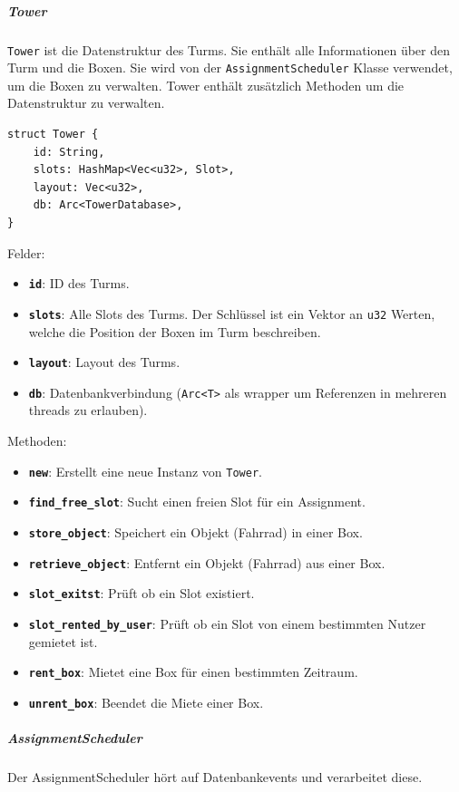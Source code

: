 \subparagraph{Tower}

\texttt{Tower} ist die Datenstruktur des Turms. Sie enthält alle Informationen über den Turm und die Boxen. Sie wird von der \texttt{AssignmentScheduler} Klasse verwendet, um die Boxen zu verwalten. Tower enthält zusätzlich Methoden um die Datenstruktur zu verwalten.


\begin{verbatim}
struct Tower {
    id: String,
    slots: HashMap<Vec<u32>, Slot>,
    layout: Vec<u32>,
    db: Arc<TowerDatabase>,
}
\end{verbatim}

Felder:
\begin{itemize}
  \item \textbf{\texttt{id}}: ID des Turms.
  \item \textbf{\texttt{slots}}: Alle Slots des Turms. Der Schlüssel ist ein Vektor an \texttt{u32} Werten, welche die Position der Boxen im Turm beschreiben.
  \item \textbf{\texttt{layout}}: Layout des Turms.
  \item \textbf{\texttt{db}}: Datenbankverbindung (\texttt{Arc<T>} als \Gls{wrapper} um Referenzen in mehreren \Glspl{thread} zu erlauben).
\end{itemize}

Methoden:
\begin{itemize}
  \item \textbf{\texttt{new}}: Erstellt eine neue Instanz von \texttt{Tower}.
  \item \textbf{\texttt{find\_free\_slot}}: Sucht einen freien Slot für ein Assignment.
  \item \textbf{\texttt{store\_object}}: Speichert ein Objekt (Fahrrad) in einer Box.
  \item \textbf{\texttt{retrieve\_object}}: Entfernt ein Objekt (Fahrrad) aus einer Box.
  \item \textbf{\texttt{slot\_exitst}}: Prüft ob ein Slot existiert.
  \item \textbf{\texttt{slot\_rented\_by\_user}}: Prüft ob ein Slot von einem bestimmten Nutzer gemietet ist.
  \item \textbf{\texttt{rent\_box}}: Mietet eine Box für einen bestimmten Zeitraum.
        \item\textbf{\texttt{unrent\_box}}: Beendet die Miete einer Box.
\end{itemize}


\subparagraph{AssignmentScheduler}

Der AssignmentScheduler hört auf Datenbankevents und verarbeitet diese.

